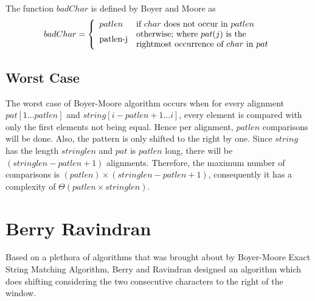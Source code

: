 The function $badChar$ is defined by Boyer and Moore as $$badChar = \left\{ \begin{array}{l l} patlen & \textrm{if } char \textrm{ does not occur in } patlen \\ \multirow{2}{*}{patlen-j} & \textrm{otherwise; where } pat(j) \textrm{ is the}\\  &  \textrm{rightmost occurrence of } char \textrm{ in } pat \end{array}\right.$$


\subsection{Worst Case}
The worst case of Boyer-Moore algorithm occurs when for every alignment $pat[1...patlen]$ and $string[i-patlen+1...i]$, every element is compared with only the first elements not being equal. Hence per alignment, $patlen$ comparisons will be done. Also, the pattern is only shifted to the right by one. Since $string$ has the length $stringlen$ and $pat$ is $patlen$ long, there will be $(stringlen-patlen+1)$ alignments. Therefore, the maximum number of comparisons is $(patlen)\times(stringlen-patlen+1)$, consequently it has a complexity of $\Theta(patlen \times stringlen)$.

\section{Berry Ravindran}		%
Based on a plethora of algorithms that was brought about by Boyer-Moore Exact String Matching Algorithm, Berry and Ravindran designed an algorithm which does shifting considering the two consecutive characters to the right of the window.
